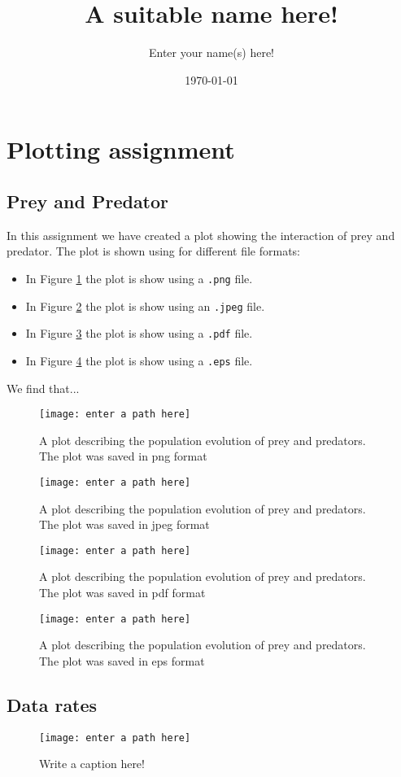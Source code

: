 \documentclass{article}
\title{A suitable name here!}
\author{Enter your name(s) here!}
\date{\today}
\begin{document}
\maketitle

\section{Plotting assignment}

\subsection{Prey and Predator}
In this assignment we have created a plot showing the interaction of prey and predator. The plot is shown using for different file formats:
\begin{itemize}
	\item In Figure \ref{fig:prey and predator:png} the plot is show using a \verb|.png| file.
	\item In Figure \ref{fig:prey and predator:jpeg} the plot is show using an \verb|.jpeg| file.
	\item In Figure \ref{fig:prey and predator:pdf} the plot is show using a \verb|.pdf| file.
	\item In Figure \ref{fig:prey and predator:eps} the plot is show using a \verb|.eps| file.
\end{itemize}

We find that...


\begin{figure}[H]
	\texttt{[image: enter a path here]}
	\caption{A plot describing the population evolution of prey and predators. The plot was saved in png format}\label{fig:prey and predator:png}
\end{figure}

\begin{figure}[H]
	\texttt{[image: enter a path here]}
	\caption{A plot describing the population evolution of prey and predators. The plot was saved in jpeg format}\label{fig:prey and predator:jpeg}
\end{figure}

\begin{figure}[H]
	\texttt{[image: enter a path here]}
	\caption{A plot describing the population evolution of prey and predators. The plot was saved in pdf format}\label{fig:prey and predator:pdf}
\end{figure}

\begin{figure}[H]
	\texttt{[image: enter a path here]}
	\caption{A plot describing the population evolution of prey and predators. The plot was saved in eps format}\label{fig:prey and predator:eps}
\end{figure}

\clearpage{} %
\subsection{Data rates}

\begin{figure}[H]
	\texttt{[image: enter a path here]}
	\caption{Write a caption here!}
\end{figure}
\end{document}
